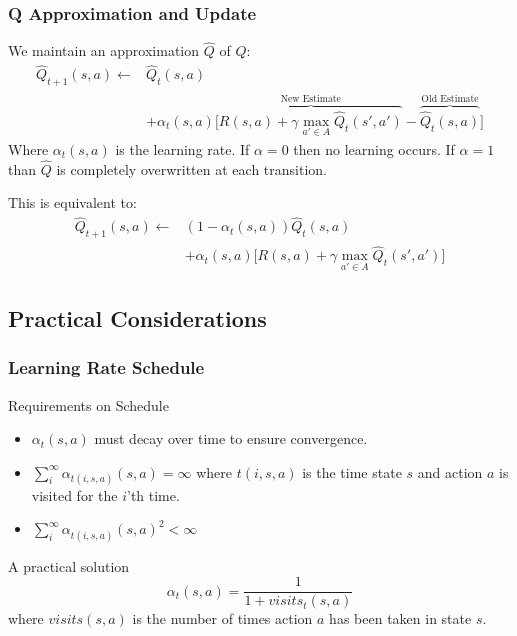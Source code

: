\documentclass[ignorenonframetext]{beamer}
\begin{document}
\begin{frame}
	\frametitle{Q Approximation and Update}
	We maintain an approximation $\hat{Q}$ of $Q$:
	\begin{align*}
		\hat{Q}_{t+1}(s,a) \leftarrow & \hat{Q}_t(s,a) \\
		& + \alpha_t(s,a)\big[ \overbrace{R(s,a) + \gamma \max_{a' \in A}
		\hat{Q}_t(s',a')}^\text{New Estimate} -
		\overbrace{\hat{Q}_t(s,a)}^\text{Old Estimate} \big]
	\end{align*}
	Where $\alpha_t(s,a)$ is the learning rate.  
	If $\alpha = 0$ then no learning occurs.  If $\alpha = 1$ than
	$\hat{Q}$ is completely overwritten at each transition.

	\pause
	This is equivalent to:
	\begin{align*}
		\hat{Q}_{t+1}(s,a) \leftarrow & (1-\alpha_t(s,a))\hat{Q}_{t}(s,a) \\
		& + \alpha_t(s,a)\big[ R(s,a) + \gamma \max_{a' \in A}
		\hat{Q}_t(s',a') \big]
	\end{align*}
\end{frame}

\subsection{Practical Considerations}

\begin{frame}
	\frametitle{Learning Rate Schedule}
	\begin{block}{Requirements on Schedule}
		\begin{itemize}
			\item $\alpha_t(s,a)$ must decay over time to ensure convergence.
				\pause
			\item $\sum_{i}^{\infty} \alpha_{t(i,s,a)}(s,a) = \infty$
				where $t(i,s,a)$ is the time state $s$ and action $a$ is visited
				for the $i$'th time.
				\pause
			\item $\sum_{i}^{\infty} \alpha_{t(i,s,a)}(s,a)^2 < \infty$ 
				\pause
		\end{itemize}
	\end{block}
	\begin{block}{A practical solution}
		\[
		\alpha_t(s,a) = \frac{1}{1 + visits_t(s,a)}
		\]
		where $visits(s,a)$ is the number of times action $a$ has been
		taken in state $s$.
	\end{block}
\end{frame}
\end{document}

